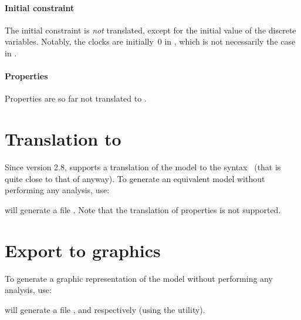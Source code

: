 \paragraph{Initial constraint}
The initial constraint is \emph{not} translated, except for the initial value of the discrete variables.
Notably, the clocks are initially~0 in \uppaal{}, which is not necessarily the case in \imitator{}.

\paragraph{Properties}
Properties are so far not translated to \uppaal{}.



\section{Translation to \hytech{}}\label{section:hytech}

Since version 2.8, \imitator{} supports a translation of the model to the \hytech{} syntax~\cite{HHW95} (that is quite close to that of \imitator{} anyway).
To generate an equivalent \hytech{} model without performing any analysis, use:


\imitator{} will generate a file .
Note that the translation of properties is not supported.


\section{Export to graphics}

To generate a graphic representation of the \NIPTA{} model without performing any analysis, use:




\imitator{} will generate a file ,  and  respectively (using the \gdot{} utility).

